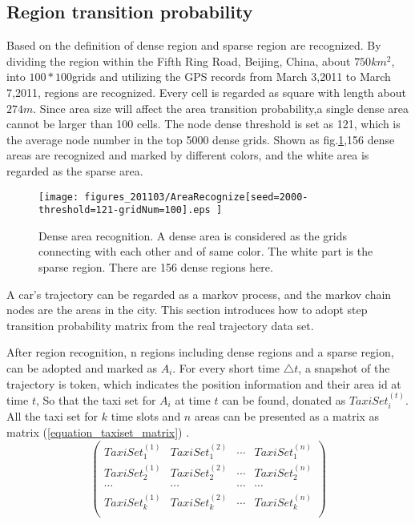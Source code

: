 \subsection{Region transition probability}


Based on the definition of dense region and sparse region are recognized. By dividing the region within the Fifth Ring Road, Beijing, China, about $750 km^2$, into $100*100$grids and utilizing the GPS records from March 3,2011 to March 7,2011, regions are recognized. Every cell is regarded as square with length about $274m$. Since area size will affect the area transition probability,a single dense area cannot be larger than 100 cells.
The node dense threshold is set as 121, which is the average node number in the top 5000 dense grids.  Shown as  fig.\ref{figure_dense_area},156 dense areas are recognized and marked by different colors, and the white area is regarded as the sparse area.


\begin{figure}[htbp]
\centering
\texttt{[image: figures\_201103/AreaRecognize[seed=2000-threshold=121-gridNum=100].eps ]}\\
\caption{Dense area recognition. A dense area is considered as the grids connecting with each other and of same color. The white part is the sparse region. There are 156 dense regions here. }\label{figure_dense_area}
\end{figure}


A car's trajectory can be regarded as a markov process, and the markov chain nodes are the areas in the city.
This section introduces how to adopt step transition probability matrix from the real trajectory data set.

        After region recognition, n regions including dense regions and a sparse region, can be adopted and marked as $A_i$.  For every short time $\triangle t$, a snapshot of the trajectory is token, which indicates the position information and their area id at time $t$, So that the taxi set for $A_i$ at time $t$ can be found, donated as $TaxiSet^{(t)}_i$. All the taxi set for $k$ time slots and $n$ areas can be presented as a matrix as matrix (\ref{equation_taxiset_matrix}) .
\begin{equation}\label{equation_taxiset_matrix}
\left(
\begin{array}{cccc}
TaxiSet^{(1)}_1 &  TaxiSet^{(2)}_1 & \cdots & TaxiSet^{(n)}_1\\
TaxiSet^{(1)}_2 &  TaxiSet^{(2)}_2 & \cdots & TaxiSet^{(n)}_2 \\
\cdots & \cdots & \cdots & \cdots \\
TaxiSet^{(1)}_k &  TaxiSet^{(2)}_k &  \cdots  & TaxiSet^{(n)}_k \\
\end{array}
\right)
\end{equation}

